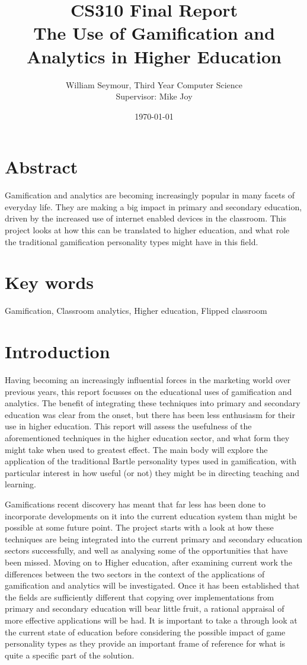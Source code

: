 \documentclass{article}
\title{CS310 Final Report \\ The Use of Gamification and Analytics in Higher Education}
\author{William Seymour, Third Year Computer Science \\ Supervisor: Mike Joy}
\date{\today}
\begin{document}
\maketitle
\clearpage
\tableofcontents

\section{Abstract}
Gamification and analytics are becoming increasingly popular in many facets of everyday life. They are making a big impact in primary and secondary education, driven by the increased use of internet enabled devices in the classroom. This project looks at how this can be translated to higher education, and what role the traditional gamification personality types might have in this field.

\section{Key words}
Gamification, Classroom analytics, Higher education, Flipped classroom

\section{Introduction}
Having becoming an increasingly influential forces in the marketing world over previous years, this report focusses on the educational uses of gamification and analytics. The benefit of integrating these techniques into primary and secondary education was clear from the onset, but there has been less enthusiasm for their use in higher education. This report will assess the usefulness of the aforementioned techniques in the higher education sector, and what form they might take when used to greatest effect. The main body will explore the application of the traditional Bartle personality types used in gamification, with particular interest in how useful (or not) they might be in directing teaching and learning.

Gamifications recent discovery has meant that far less has been done to incorporate developments on it into the current education system than might be possible at some future point. The project starts with a look at how these techniques are being integrated into the current primary and secondary education sectors successfully, and well as analysing some of the opportunities that have been missed. Moving on to Higher education, after examining current work the differences between the two sectors in the context of the applications of gamification and analytics will be investigated. Once it has been established that the fields are sufficiently different that copying over implementations from primary and secondary education will bear little fruit, a rational appraisal of more effective applications will be had. It is important to take a through look at the current state of education before considering the possible impact of game personality types as they provide an important frame of reference for what is quite a specific part of the solution.
\end{document}

